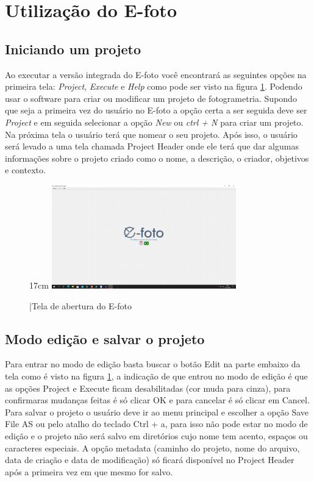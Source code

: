 \section{Utilização do E-foto}
\subsection{Iniciando um projeto}
Ao executar a versão integrada do E-foto você encontrará as seguintes opções na primeira tela: \textit{Project}, \textit{Execute} e \textit{Help} como pode ser visto na figura \ref{fig:efoto1}. Podendo usar o software para criar ou modificar um projeto de fotogrametria.  Supondo que seja a primeira vez do usuário no E-foto a opção certa a ser seguida deve ser \textit{Project} e em seguida selecionar a opção \textit{New} ou \textit{ctrl + N} para criar um projeto. Na próxima tela o usuário terá que nomear o seu projeto. Após isso, o usuário será levado a uma tela chamada Project Header onde ele terá que dar algumas informações sobre o projeto criado como o nome, a descrição, o criador, objetivos e contexto.

\begin{figure}[!ht]{17cm}
	\centering
	\includegraphics[width=8cm]{Figuras/efoto1.jpg}
	\caption{|Tela de abertura do E-foto} \label{fig:efoto1}
\end{figure}

\subsection{Modo edição e salvar o projeto}
Para entrar no modo de edição basta buscar o botão Edit na parte embaixo da tela como é visto na figura \ref{fig:efoto1}, a indicação de que entrou no modo de edição é que as opções Project e Execute ficam desabilitadas (cor muda para cinza), para confirmaras mudanças feitas é só clicar OK e para cancelar é só clicar em Cancel.
Para salvar o projeto o usuário deve ir ao menu principal e escolher a opção Save File AS ou pelo atalho do teclado Ctrl + a, para isso não pode estar no modo de edição e o projeto não será salvo em diretórios cujo nome tem acento, espaços ou caracteres especiais.
A opção metadata (caminho do projeto, nome do arquivo, data de criação e data de modificação) só ficará disponível no Project Header após a primeira vez em que mesmo for salvo.

